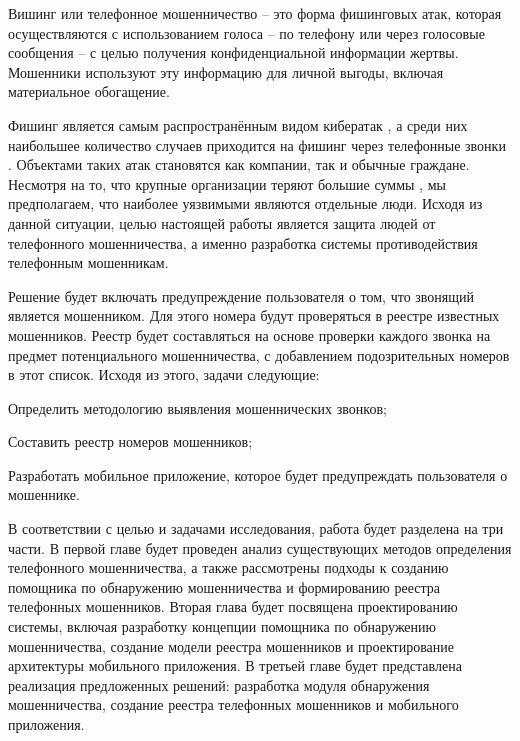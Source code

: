 Вишинг или телефонное мошенничество – это форма фишинговых атак, которая осуществляются с использованием голоса – по телефону или через голосовые сообщения – с целью получения конфиденциальной информации жертвы. Мошенники используют эту информацию для личной выгоды, включая материальное обогащение.

Фишинг является самым распространённым видом кибератак \cite{lewis2018}, а среди них наибольшее количество случаев приходится на фишинг через телефонные звонки \cite{petrosyan2024}. Объектами таких атак становятся как компании, так и обычные граждане. Несмотря на то, что крупные организации теряют большие суммы \cite{hooper2024}, мы предполагаем, что наиболее уязвимыми являются отдельные люди. Исходя из данной ситуации, целью настоящей работы является защита людей от телефонного мошенничества, а именно разработка системы противодействия телефонным мошенникам.

Решение будет включать предупреждение пользователя о том, что звонящий является мошенником. Для этого номера будут проверяться в реестре известных мошенников. Реестр будет составляться на основе проверки каждого звонка на предмет потенциального мошенничества, с добавлением подозрительных номеров в этот список. Исходя из этого, задачи следующие: 
\begin{enumerate*}
	\item Определить методологию выявления мошеннических звонков;
	\item Составить реестр номеров мошенников;
	\item Разработать мобильное приложение, которое будет предупреждать пользователя о мошеннике.
\end{enumerate*}

В соответствии с целью и задачами исследования, работа будет разделена на три части. В первой главе будет проведен анализ существующих методов определения телефонного мошенничества, а также рассмотрены подходы к созданию помощника по обнаружению мошенничества и формированию реестра телефонных мошенников. Вторая глава будет посвящена проектированию системы, включая разработку концепции помощника по обнаружению мошенничества, создание модели реестра мошенников и проектирование архитектуры мобильного приложения. В третьей главе будет представлена реализация предложенных решений: разработка модуля обнаружения мошенничества, создание реестра телефонных мошенников и мобильного приложения.

\newpage